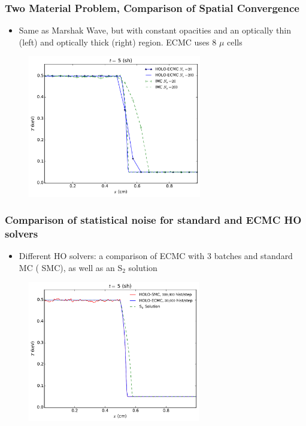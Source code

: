 \documentclass[xcolor=dvipsnames,hyperref={pdfpagelabels=false},unknownkeysallowed]{beamer}
\newcommand{\colb}[1]{{\color{blue} #1}}
\newcommand{\colr}[1]{{\color{red} #1}}
\newlength{\wideitemsep}
\let\olditem\item
\renewcommand{\item}{\setlength{\itemsep}{\wideitemsep}\olditem}
\begin{document}
{%
\begin{frame}
    \frametitle{Two Material Problem, Comparison of Spatial Convergence}
    \begin{block}{}
        \begin{itemize}
            \item Same as Marshak Wave, but with constant opacities and an optically thin (left) and
                optically thick (right) region. ECMC uses 8 $\mu$ cells
        \end{itemize}
    \end{block}
\begin{figure}
    \centering
    \includegraphics[width=0.6755799\textwidth]{two_mat_conv.pdf}
\end{figure}

\end{frame}

\begin{frame}
    \frametitle{Comparison of statistical noise for standard and ECMC HO solvers}
    \begin{block}{}
        {\small
    \begin{itemize}
        \item Different HO solvers: a
            comparison of
            \colb{ECMC} with 3 batches and standard MC (\colr{SMC}), as well as an S$_2$
            solution
    \end{itemize}
}
    \end{block}
    \centering
    \begin{figure}
    \includegraphics[width=0.6699\textwidth]{two_mat_ho_compare.pdf}
    \centering
    \end{figure}
\end{frame}

}
\end{document}

